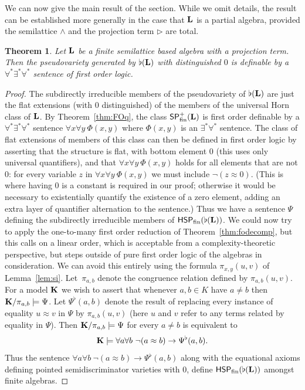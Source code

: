 \documentclass[reqno]{amsart}
\theoremstyle{plain}
\newtheorem{thm}{Theorem}[section]
\theoremstyle{definition}
\newcommand{\tr}{\triangleright}
\begin{document}
We can now give the main result of the section.  While we omit details, the result can be established more generally in the case that ${\bf L}$ is a partial algebra, provided the semilattice $\wedge$ and the projection term $\tr$ are total.
\begin{thm}\label{thm:FO}
Let ${\bf L}$ be a finite semilattice based algebra with a projection term.  Then the pseudovariety generated by $\flat({\bf L})$ with distinguished $0$ is definable by a $\forall^*\exists^*\forall^*$ sentence of first order logic.
\end{thm}
\begin{proof}
The subdirectly irreducible members of the pseudovariety of $\flat({\bf L})$ are just the flat extensions (with $0$ distinguished) of the members of the universal Horn class of ${\bf L}$.  By Theorem~\ref{thm:FOq}, the class $\mathsf{SP}^+_{\rm fin}({\bf L})$ is first order definable by a $\forall^*\exists^*\forall^*$ sentence $\forall x\forall y\ \Phi(x,y)$ where $\Phi(x,y)$ is an $\exists^*\forall^*$ sentence.  The class of flat extensions of members of this class can then be defined in first order logic by asserting that the structure is flat, with bottom element $0$ (this uses only universal quantifiers), and that $\forall x\forall y\ \Phi(x,y)$ holds for all elements that are not $0$: for every variable $z$ in $\forall x\forall y\ \Phi(x,y)$ we must include $\neg(z\approx 0)$.  (This is where having $0$ is a constant is required in our proof; otherwise it would be necessary to existentially quantify the existence of a zero element, adding an extra layer of quantifier alternation to the sentence.)  Thus we have a sentence $\Psi$ defining the subdirectly irreducible members of
$\mathsf{HSP}_{\rm fin}(\flat({\bf L}))$.
We could now try to apply the one-to-many first order reduction of Theorem~\ref{thm:fodecomp}, but this calls on a linear order, which is acceptable from a complexity-theoretic perspective, but steps outside of pure first order logic of the algebras in consideration.  We can avoid this entirely using the formula $\pi_{x,y}(u,v)$ of Lemma~\ref{lem:si}.  
Let~$\pi_{a,b}$ denote the congruence relation defined by $\pi_{a,b}(u,v)$.  For a model ${\bf K}$ we wish to assert that whenever $a,b\in K$ have $a\neq b$ then ${\bf K}/\pi_{a,b}\models \Psi$.  
Let $\Psi^\flat(a,b)$ denote the result of replacing every instance of equality $u\approx v$ in $\Psi$ by $\pi_{a,b}(u,v)$ (here $u$ and $v$ refer to any terms related by equality in $\Psi$).  Then ${\bf K}/\pi_{a,b}\models \Psi$ for every $a\neq b$ is equivalent to 
\[
{\bf K}\models \forall a\forall b\ \neg(a\approx b)\rightarrow \Psi^\flat(a,b).
\]
Thus the sentence $\forall a\forall b\ \neg(a\approx b)\rightarrow \Psi^\flat(a,b)$ along with the equational axioms defining pointed semidiscriminator varieties with $0$, define $\mathsf{HSP}_{\rm fin}(\flat({\bf L}))$ amongst finite algebras.
\end{proof}
\end{document}
